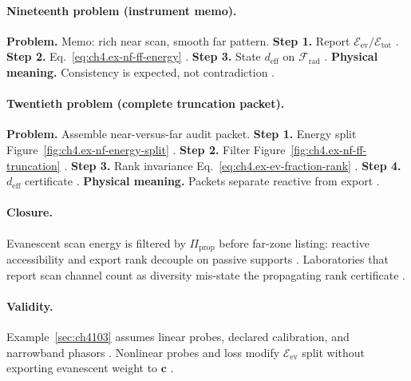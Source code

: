 \paragraph{Nineteenth problem (instrument memo).}
\textbf{Problem.} Memo: rich near scan, smooth far pattern.
\textbf{Step 1.} Report \(\mathcal{E}_{\mathrm{ev}}/\mathcal{E}_{\mathrm{tot}}\) \cite{stratton1941,jackson1999,harrington2001,hansen1988,devaney2004}.
\textbf{Step 2.} Eq.~\eqref{eq:ch4.ex-nf-ff-energy} \cite{harrington2001,stratton1941,devaney2004,hansen1988,jackson1999}.
\textbf{Step 3.} State \(d_{\mathrm{eff}}\) on \(\mathcal{F}_{\mathrm{rad}}\) \cite{stratton1941,harrington2001,devaney2004,hansen1988,jackson1999}.
\textbf{Physical meaning.} Consistency is expected, not contradiction \cite{harrington2001,stratton1941,hansen1988,devaney2004,jackson1999}.

\paragraph{Twentieth problem (complete truncation packet).}
\textbf{Problem.} Assemble near-versus-far audit packet.
\textbf{Step 1.} Energy split Figure~\ref{fig:ch4.ex-nf-energy-split} \cite{stratton1941,harrington2001,hansen1988,devaney2004,jackson1999}.
\textbf{Step 2.} Filter Figure~\ref{fig:ch4.ex-nf-ff-truncation} \cite{harrington2001,stratton1941,devaney2004,hansen1988,jackson1999}.
\textbf{Step 3.} Rank invariance Eq.~\eqref{eq:ch4.ex-ev-fraction-rank} \cite{stratton1941,harrington2001,devaney2004,hansen1988,jackson1999}.
\textbf{Step 4.} \(d_{\mathrm{eff}}\) certificate \cite{harrington2001,stratton1941,hansen1988,devaney2004,jackson1999}.
\textbf{Physical meaning.} Packets separate reactive from export \cite{stratton1941,harrington2001,hansen1988,devaney2004,jackson1999}.

\paragraph{Closure.}
Evanescent scan energy is filtered by \(\Pi_{\mathrm{prop}}\) before far-zone listing: reactive accessibility and export rank decouple on passive supports
\cite{stratton1941,harrington2001,hansen1988,jackson1999,devaney2004}. Laboratories that report scan channel count as diversity mis-state the propagating rank
certificate \cite{harrington2001,stratton1941}.

\paragraph{Validity.}
Example~\ref{sec:ch4103} assumes linear probes, declared calibration, and narrowband phasors \cite{stratton1941,harrington2001,hansen1988,jackson1999,devaney2004}.
Nonlinear probes and loss modify \(\mathcal{E}_{\mathrm{ev}}\) split without exporting evanescent weight to \(\mathbf{c}\) \cite{harrington2001,devaney2004}.
